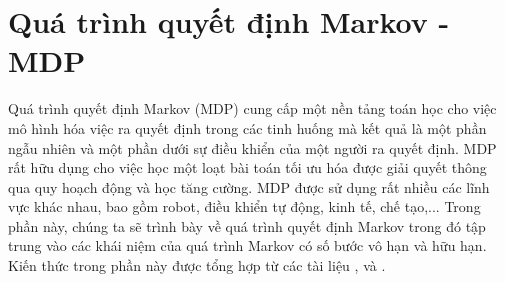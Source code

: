 \chapter{Quá trình quyết định Markov - MDP}
\label{ch:03}
Quá trình quyết định Markov (MDP) cung cấp một nền tảng toán học cho việc mô hình hóa việc ra quyết định trong các tinh huống mà kết quả là một phần ngẫu nhiên và một phần dưới sự điều khiển của một người ra quyết định. MDP rất hữu dụng cho việc học một loạt bài toán tối ưu hóa được giải quyết thông qua quy hoạch động và học tăng cường. MDP được sử dụng rất nhiều các lĩnh vực khác nhau, bao gồm robot, điều khiển tự động, kinh tế, chế tạo,... Trong phần này, chúng ta sẽ trình bày về quá trình quyết định Markov trong đó tập trung vào các khái niệm của quá trình Markov có số bước vô hạn và hữu hạn. Kiến thức trong phần này được tổng hợp từ các tài liệu \cite{Belman1957}, \cite{Sutton1999} và \cite{Puterman1994}.
